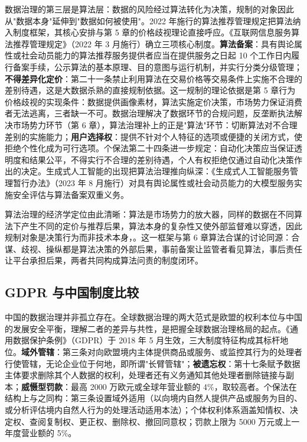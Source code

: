 数据治理的第三层是算法层：数据的风险经过算法转化为决策，规制的对象因此从"数据本身"延伸到"数据如何被使用"。2022 年施行的算法推荐管理规定把算法纳入制度框架，其核心安排与第 5 章的价格歧视理论直接呼应。《互联网信息服务算法推荐管理规定》（2022 年 3 月施行）确立三项核心制度。\textbf{算法备案}：具有舆论属性或社会动员能力的算法推荐服务提供者应当在提供服务之日起 10 个工作日内履行备案手续，公示算法的基本原理、目的意图与运行机制，并实行分类分级管理；\textbf{不得差异化定价}：第二十一条禁止利用算法在交易价格等交易条件上实施不合理的差别待遇，这是大数据杀熟的直接规制依据。这一规制的理论依据是第 5 章行为价格歧视的实现条件：数据提供画像素材，算法实施定价决策，市场势力保证消费者无法逃离，三者缺一不可。数据治理解决了数据环节的合规问题，反垄断执法解决市场势力环节（第 6 章），算法治理补上的正是"算法"环节：切断算法对不合理差别的实施能力；\textbf{用户选择权}：提供不针对个人特征的选项或便捷的关闭方式，使拒绝个性化成为可行选项。个保法第二十四条进一步规定：自动化决策应当保证透明度和结果公平，不得实行不合理的差别待遇，个人有权拒绝仅通过自动化决策作出的决定。生成式人工智能的出现把算法治理推向纵深：《生成式人工智能服务管理暂行办法》（2023 年 8 月施行）对具有舆论属性或社会动员能力的大模型服务实施安全评估与算法备案双重义务。

算法治理的经济学定位由此清晰：算法是市场势力的放大器，同样的数据在不同算法下产生不同的定价与推荐后果，算法本身的复杂性又使外部监督难以穿透，因此规制对象是决策行为而非技术本身，。这一框架与第 6 章算法合谋的讨论同源：合谋、歧视、操纵都是算法决策的外部后果，事前备案让监管者看见算法，事后责任让平台承担后果，两者共同构成算法问责的制度闭环。

\subsection{GDPR 与中国制度比较}

中国的数据治理并非孤立存在。全球数据治理的两大范式是欧盟的权利本位与中国的发展安全平衡，理解二者的差异与共性，是把握全球数据治理格局的起点。《通用数据保护条例》（GDPR）于 2018 年 5 月生效，三大制度特征构成其标杆地位。\textbf{域外管辖}：第三条对向欧盟境内主体提供商品或服务、或监控其行为的处理者行使管辖，无论企业位于何地，即所谓"长臂管辖"；\textbf{被遗忘权}：第十七条赋予数据主体要求删除其个人数据的权利，处理者还有义务通知其他处理者删除链接与副本；\textbf{威慑型罚款}：最高 2000 万欧元或全球年营业额的 4\%，取较高者。个保法在结构上与之同构：第三条设置域外适用（以向境内自然人提供产品或服务为目的、或分析评估境内自然人行为的处理活动适用本法）；个体权利体系涵盖知情权、决定权、查阅复制权、更正权、删除权、撤回同意权；罚款上限为 5000 万元或上一年度营业额的 5\%。

